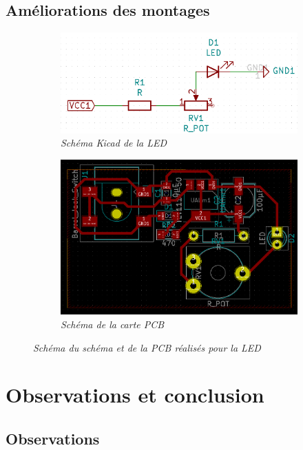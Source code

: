 \subsection{Améliorations des montages}
\begin{figure}[H]
	\centering
	\begin{subfigure}[t]{0.49\textwidth}
		\centering
		\includegraphics[scale=0.2]{figures/schema_kicad.png}
		\caption{\small{\textit{Schéma Kicad de la LED}}}
		\label{fig:led_kicad}
	\end{subfigure}%
	\begin{subfigure}[t]{0.49\textwidth}
		\centering
		\includegraphics[scale=0.2]{figures/schema_pcb.png}
		\caption{\small{\textit{Schéma de la carte PCB}}}
		\label{fig:led_pcb}
	\end{subfigure}
	\caption{\small{\textit{Schéma du schéma et de la PCB réalisés pour la LED}}}
	\label{fig:led}
\end{figure}
\section{Observations et conclusion}
\subsection{Observations}
